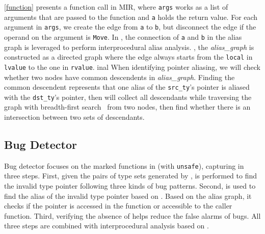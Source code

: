 {\autoref{function} presents a function call in MIR, where \texttt{args} works as a list of arguments that are passed to the function and \texttt{a} holds the return value}.
For each argument in \texttt{args}, we create the edge from \texttt{a} to \texttt{b}, but disconnect the edge if the operand on the argument is \texttt{Move}.
%
{In \bugdetector, the connection of \texttt{a} and \texttt{b} in the alias graph is leveraged to perform interprocedural alias analysis}.
%
, the \textit{alias\_graph} is constructed as a directed graph where the edge always starts from the \texttt{local} in \texttt{lvalue} to the one in \texttt{rvalue}.
inal{
When identifying pointer aliasing, we will check whether two nodes have common descendents in \textit{alias\_graph}.
Finding the common descendent represents that one alias of the \texttt{src\_ty}'s pointer is aliased with the \texttt{dst\_ty}'s pointer,
then \bugdetector will collect all descendants while traversing the graph with breadth-first search~\cite{Breadthf77online} from two nodes, then find whether there is an intersection between two sets of descendants.
}




\subsection{Bug Detector} \label{compthree}
{
Bug detector focuses on the marked functions in \pcg (with \texttt{unsafe})}, capturing \bugs in three steps. 
%
First, given the pairs of type sets generated by \analysisone, \checkone is performed to find the invalid type pointer following three kinds of bug patterns.
%
Second, \checktwo is used to find the alias of the invalid type pointer
based on \analysistwo.
Based on the alias graph, it checks if the pointer is accessed in the function or accessible to the caller function. 
%
Third, verifying the absence of \tc helps reduce the false alarms of bugs.
%
{All three steps are combined with interprocedural analysis based on \pcg}.








